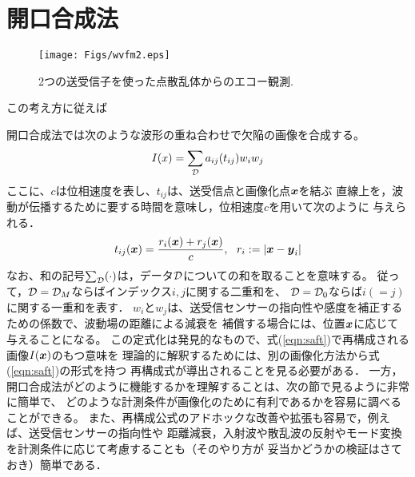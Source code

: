 \documentclass[10pt,a4j,dvipdfmx]{jarticle}
\begin{document}
\section{開口合成法}
\begin{figure}[h]
	\begin{center}
	\texttt{[image: Figs/wvfm2.eps]} 
	\end{center}
	\caption{2つの送受信子を使った点散乱体からのエコー観測.} 
	\label{fig:wvfm2}
\end{figure}
この考え方に従えば

開口合成法では次のような波形の重ね合わせで欠陥の画像を合成する。
\begin{equation}
	I(x)=\sum_{\cal D}a_{ij}(t_{ij})w_iw_j
	\label{eqn:saft}
\end{equation}
ここに、$c$は位相速度を表し、$t_{ij}$は、送受信点と画像化点$\mbox{\boldmath $x$}$を結ぶ
直線上を，波動が伝播するために要する時間を意味し，位相速度$c$を用いて次のように
与えられる．
\begin{equation}
	t_{ij}(\mbox{\boldmath $x$})=\frac{r_i(\mbox{\boldmath $x$})+r_j(\mbox{\boldmath $x$})}{c}, \ \ r_i:=\left| \mbox{\boldmath $x$} -\mbox{\boldmath $y$}_i\right|
	\label{eqn:}
\end{equation}
なお、和の記号$\sum_{\cal D}(\cdot)$は，データ$\cal D$についての和を取ることを意味する。
従って，${\cal D}= {\cal D}_M$ならばインデックス$i,j$に関する二重和を、
${\cal D} ={\cal D}_0$ならば$i(=j)$に関する一重和を表す．
$w_i$と$w_j$は、送受信センサーの指向性や感度を補正するための係数で、波動場の距離による減衰を
補償する場合には、位置$\mbox{\boldmath $x$}$に応じて与えることになる。
この定式化は発見的なもので、式(\ref{eqn:saft})で再構成される画像$I(\mbox{\boldmath $x$})$のもつ意味を
理論的に解釈するためには、別の画像化方法から式(\ref{eqn:saft})の形式を持つ
再構成式が導出されることを見る必要がある．
一方，開口合成法がどのように機能するかを理解することは、次の節で見るように非常に簡単で、
どのような計測条件が画像化のために有利であるかを容易に調べることができる。
また、再構成公式のアドホックな改善や拡張も容易で，例えば、送受信センサーの指向性や
距離減衰，入射波や散乱波の反射やモード変換を計測条件に応じて考慮することも（そのやり方が
妥当かどうかの検証はさておき）簡単である．
\end{document}
